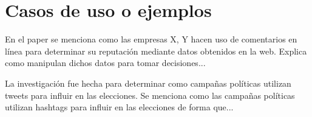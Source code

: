 \documentclass[conference]{IEEEtran}
\begin{document}


%
%

\section{Casos de uso o ejemplos}




En el paper \cite{b2} se menciona como las empresas X, Y hacen uso de comentarios en línea para determinar su reputación mediante datos obtenidos en la web. Explica como manipulan dichos datos para tomar decisiones...

La investigación \cite{b4} fue hecha para determinar como campañas políticas utilizan tweets para influir en las elecciones. Se menciona como las campañas políticas utilizan hashtags para influir en las elecciones de forma que...  
\end{document}
